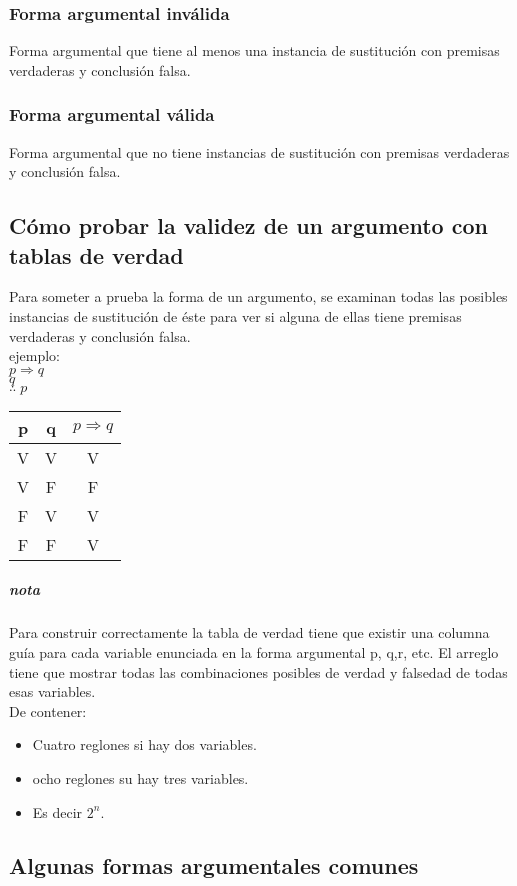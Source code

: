\documentclass[10pt]{book} 						%
\begin{document}
\subsubsection{Forma argumental inválida}
Forma argumental que tiene al menos una instancia de sustitución con premisas verdaderas y conclusión falsa.
\subsubsection{Forma argumental válida}
Forma argumental que no tiene instancias de sustitución con premisas verdaderas y conclusión falsa.
\subsection{Cómo probar la validez de un argumento con tablas de verdad}
Para someter a prueba la forma de un argumento, se examinan todas las posibles instancias de sustitución de éste para ver si alguna de ellas tiene premisas verdaderas y conclusión falsa.\\
ejemplo:\\
$p \Rightarrow q$\\
$q$\\
$\therefore \; p$
\begin{center}
\begin{tabular}{c c c}
p & q & $p \Rightarrow q$\\
\hline
V&V&V\\
V&F&F\\
F&V&V\\
F&F&V\\
\end{tabular}
\end{center}
\subparagraph{nota}
Para construir correctamente la tabla de verdad tiene que existir una columna guía para cada variable enunciada en la forma argumental p, q,r, etc. El arreglo tiene que mostrar todas las combinaciones posibles de verdad y falsedad de todas esas variables.\\
De contener:\\
\begin{itemize}
\item Cuatro reglones si hay dos variables.
\item ocho reglones su hay tres variables.
\item Es decir $2^n$.
\end{itemize}
\subsection{Algunas formas argumentales comunes}
\end{document}
